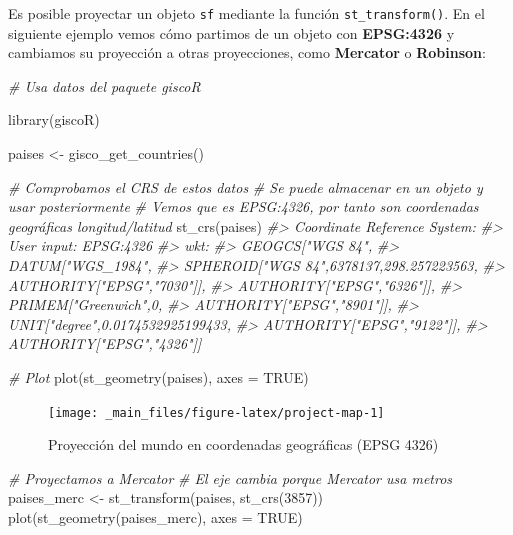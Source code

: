 \documentclass[
]{report}
\newenvironment{Shaded}{\begin{snugshade}}{\end{snugshade}}
\newcommand{\AttributeTok}[1]{\textcolor[rgb]{0.77,0.63,0.00}{#1}}
\newcommand{\CommentTok}[1]{\textcolor[rgb]{0.56,0.35,0.01}{\textit{#1}}}
\newcommand{\ConstantTok}[1]{\textcolor[rgb]{0.00,0.00,0.00}{#1}}
\newcommand{\DecValTok}[1]{\textcolor[rgb]{0.00,0.00,0.81}{#1}}
\newcommand{\FunctionTok}[1]{\textcolor[rgb]{0.00,0.00,0.00}{#1}}
\newcommand{\NormalTok}[1]{#1}
\newcommand{\OtherTok}[1]{\textcolor[rgb]{0.56,0.35,0.01}{#1}}
\begin{document}
Es posible proyectar un objeto \texttt{sf} mediante la función \texttt{st\_transform()}. En el
siguiente ejemplo vemos cómo partimos de un objeto con \textbf{EPSG:4326} y cambiamos
su proyección a otras proyecciones, como \textbf{Mercator} o \textbf{Robinson}:

\begin{Shaded}
\begin{Highlighting}[]

\CommentTok{\# Usa datos del paquete giscoR}

\FunctionTok{library}\NormalTok{(giscoR)}

\NormalTok{paises }\OtherTok{\textless{}{-}} \FunctionTok{gisco\_get\_countries}\NormalTok{()}

\CommentTok{\# Comprobamos el CRS de estos datos}
\CommentTok{\# Se puede almacenar en un objeto y usar posteriormente}
\CommentTok{\# Vemos que es EPSG:4326, por tanto son coordenadas geográficas longitud/latitud}
\FunctionTok{st\_crs}\NormalTok{(paises)}
\CommentTok{\#\textgreater{} Coordinate Reference System:}
\CommentTok{\#\textgreater{}   User input: EPSG:4326 }
\CommentTok{\#\textgreater{}   wkt:}
\CommentTok{\#\textgreater{} GEOGCS["WGS 84",}
\CommentTok{\#\textgreater{}     DATUM["WGS\_1984",}
\CommentTok{\#\textgreater{}         SPHEROID["WGS 84",6378137,298.257223563,}
\CommentTok{\#\textgreater{}             AUTHORITY["EPSG","7030"]],}
\CommentTok{\#\textgreater{}         AUTHORITY["EPSG","6326"]],}
\CommentTok{\#\textgreater{}     PRIMEM["Greenwich",0,}
\CommentTok{\#\textgreater{}         AUTHORITY["EPSG","8901"]],}
\CommentTok{\#\textgreater{}     UNIT["degree",0.0174532925199433,}
\CommentTok{\#\textgreater{}         AUTHORITY["EPSG","9122"]],}
\CommentTok{\#\textgreater{}     AUTHORITY["EPSG","4326"]]}

\CommentTok{\# Plot}
\FunctionTok{plot}\NormalTok{(}\FunctionTok{st\_geometry}\NormalTok{(paises), }\AttributeTok{axes =} \ConstantTok{TRUE}\NormalTok{)}
\end{Highlighting}
\end{Shaded}

\begin{figure}

{\centering \texttt{[image: \_main\_files/figure-latex/project-map-1]} 

}

\caption{Proyección del mundo en coordenadas geográficas (EPSG 4326)}\label{fig:project-map-1}
\end{figure}

\begin{Shaded}
\begin{Highlighting}[]

\CommentTok{\# Proyectamos a Mercator}
\CommentTok{\# El eje cambia porque Mercator usa metros}
\NormalTok{paises\_merc }\OtherTok{\textless{}{-}} \FunctionTok{st\_transform}\NormalTok{(paises, }\FunctionTok{st\_crs}\NormalTok{(}\DecValTok{3857}\NormalTok{))}
\FunctionTok{plot}\NormalTok{(}\FunctionTok{st\_geometry}\NormalTok{(paises\_merc), }\AttributeTok{axes =} \ConstantTok{TRUE}\NormalTok{)}
\end{Highlighting}
\end{Shaded}
\end{document}
